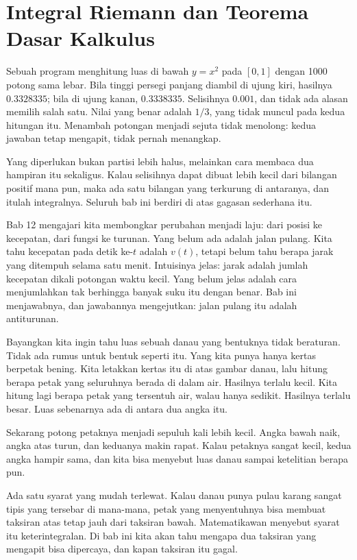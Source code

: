 \chapter{Integral Riemann dan Teorema Dasar Kalkulus}

Sebuah program menghitung luas di bawah $y=x^2$ pada $[0,1]$ dengan 1000 potong sama
lebar. Bila tinggi persegi panjang diambil di ujung kiri, hasilnya $0.3328335$; bila di
ujung kanan, $0.3338335$. Selisihnya $0.001$, dan tidak ada alasan memilih salah satu.
Nilai yang benar adalah $1/3$, yang tidak muncul pada kedua hitungan itu. Menambah
potongan menjadi sejuta tidak menolong: kedua jawaban tetap mengapit, tidak pernah
menangkap.

Yang diperlukan bukan partisi lebih halus, melainkan cara membaca dua hampiran itu
sekaligus. Kalau selisihnya dapat dibuat lebih kecil dari bilangan positif mana pun,
maka ada satu bilangan yang terkurung di antaranya, dan itulah integralnya. Seluruh
bab ini berdiri di atas gagasan sederhana itu.

Bab 12 mengajari kita membongkar perubahan menjadi laju: dari posisi ke kecepatan,
dari fungsi ke turunan. Yang belum ada adalah jalan pulang. Kita tahu kecepatan pada
detik ke-$t$ adalah $v(t)$, tetapi belum tahu berapa jarak yang ditempuh selama satu
menit. Intuisinya jelas: jarak adalah jumlah kecepatan dikali potongan waktu kecil.
Yang belum jelas adalah cara menjumlahkan tak berhingga banyak suku itu dengan benar.
Bab ini menjawabnya, dan jawabannya mengejutkan: jalan pulang itu adalah antiturunan.

\begin{untukanak}
Bayangkan kita ingin tahu luas sebuah danau yang bentuknya tidak beraturan. Tidak ada
rumus untuk bentuk seperti itu. Yang kita punya hanya kertas berpetak bening. Kita
letakkan kertas itu di atas gambar danau, lalu hitung berapa petak yang seluruhnya
berada di dalam air. Hasilnya terlalu kecil. Kita hitung lagi berapa petak yang
tersentuh air, walau hanya sedikit. Hasilnya terlalu besar. Luas sebenarnya ada di
antara dua angka itu.

Sekarang potong petaknya menjadi sepuluh kali lebih kecil. Angka bawah naik, angka atas
turun, dan keduanya makin rapat. Kalau petaknya sangat kecil, kedua angka hampir sama,
dan kita bisa menyebut luas danau sampai ketelitian berapa pun.

Ada satu syarat yang mudah terlewat. Kalau danau punya pulau karang sangat tipis yang
tersebar di mana-mana, petak yang menyentuhnya bisa membuat taksiran atas tetap jauh
dari taksiran bawah. Matematikawan menyebut syarat itu keterintegralan. Di bab ini kita
akan tahu mengapa dua taksiran yang mengapit bisa dipercaya, dan kapan taksiran itu
gagal.
\end{untukanak}

